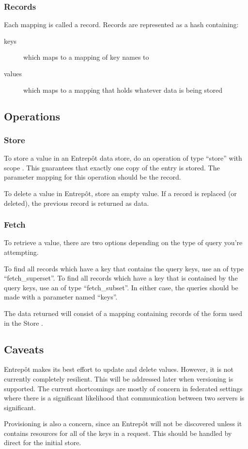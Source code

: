 \subsubsection{Records}

Each mapping is called a record.  Records are represented as a hash containing:

\begin{description} 
	\item[keys] which maps to a mapping of key names to \resources{}
	\item[values] which maps to a mapping that holds whatever data is being stored
\end{description}

\subsection{Operations}

\subsubsection{Store}

To store a value in an Entrep\^ot data store, do an operation of type ``store'' with scope \single{}.  This guarantees that exactly one copy of the entry is stored.  The parameter mapping for this operation should be the record.

To delete a value in Entrep\^ot, store an empty value.  If a record is replaced (or deleted), the previous record is returned as data.

\subsubsection{Fetch}

To retrieve a value, there are two options depending on the type of query you're attempting.

To find all records which have a key that contains the query keys, use an \operation{} of type ``fetch\_superset''.  To find all records which have a key that is contained by the query keys, use an \operation{} of type ``fetch\_subset''.  In either case, the queries should be made with a parameter named ``keys''.

The data returned will consist of a mapping containing records of the form used in the Store \operation{}.

\subsection{Caveats}

Entrep\^ot makes its best effort to update and delete values.  However, it is not currently completely resilient.  This will be addressed later when versioning is supported.  The current shortcomings are mostly of concern in federated settings where there is a significant likelihood that communication between two servers is significant.

Provisioning is also a concern, since an Entrep\^ot \agent{} will not be discovered unless it contains resources for all of the keys in a request.  This should be handled by direct \operations{} for the initial store.